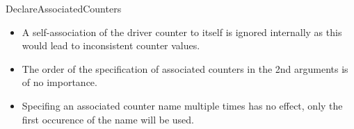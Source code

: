 \documentclass[12pt,a4paper,oneside]{article}
\begin{document}
\begin{docCommand}{DeclareAssociatedCounters}{}
\begin{itemize}
\begin{itemize}
       On the other side,  belong to a hierarchy. The driver counter dominates the associated counters. 
        
      \end{itemize}
  \item A self-association of the driver counter to itself is ignored internally as this would lead to inconsistent counter values. 
  \item The order of the specification of associated counters in the 2nd arguments is of no importance.
  \item Specifing an associated counter name multiple times has no effect, only the first occurence of the name will be used.
\end{itemize}

\end{docCommand}
\end{document}
